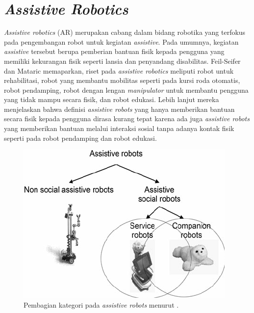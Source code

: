 \section{\emph{Assistive Robotics}}
\label{sec:sociallyassistiverobots}

\emph{Assistive robotics} (AR) merupakan cabang dalam bidang robotika yang terfokus pada pengembangan robot untuk kegiatan \emph{assistive}.
Pada umumnya, kegiatan \emph{assistive} tersebut berupa pemberian bantuan fisik kepada pengguna yang memiliki kekurangan fisik seperti lansia dan penyandang disabilitas.
Feil-Seifer dan Mataric \citep{cit:seifer2005} memaparkan,
  riset pada \emph{assistive robotics} meliputi robot untuk rehabilitasi,
  robot yang membantu mobilitas seperti pada kursi roda otomatis,
  robot pendamping,
  robot dengan lengan \emph{manipulator} untuk membantu pengguna yang tidak mampu secara fisik,
  dan robot edukasi.
Lebih lanjut mereka menjelaskan bahwa definisi \emph{assistive robots} yang hanya memberikan bantuan secara fisik kepada pengguna dirasa kurang tepat karena ada juga \emph{assistive robots} yang memberikan bantuan melalui interaksi sosial tanpa adanya kontak fisik seperti pada robot pendamping dan robot edukasi.

\begin{figure}[ht]
  \centering
  \includegraphics[scale=0.45]{gambar/kategori-assistive-robots.png}
  \caption{Pembagian kategori pada \emph{assistive robots} menurut \citet{cit:heerink2010}.}
  \label{fig:kategoriassistiverobots}
\end{figure}


